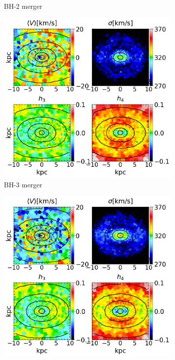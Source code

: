 \documentclass[english, oneside]{HYgradu}
\begin{document}
\begin{figure}
\begin{subfigure}[b]{0.49\textwidth}
		\caption{BH-2 merger}
	\end{subfigure}
	\begin{subfigure}[b]{0.49\textwidth}
		\includegraphics[width=\textwidth]{BH_3.png}
		\caption{BH-3 merger}
	\end{subfigure}
	\begin{subfigure}[b]{0.49\textwidth}
		\includegraphics[width=\textwidth]{BH_4.png}

\end{subfigure}
\end{figure}
\end{document}
